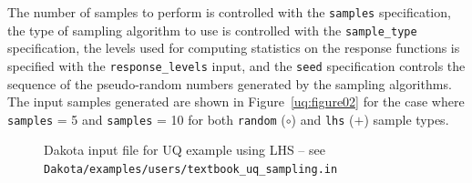 The number of samples to
perform is controlled with the \texttt{samples} specification, the
type of sampling algorithm to use is controlled with the
\texttt{sample\_type} specification, the levels used for computing
statistics on the response functions is specified with the
\texttt{response\_levels} input, and the \texttt{seed} specification
controls the sequence of the pseudo-random numbers generated by the
sampling algorithms. The input samples generated are shown in
Figure~\ref{uq:figure02} for the case where \texttt{samples} = 5 and
\texttt{samples} = 10 for both \texttt{random} ($\circ$) and 
\texttt{lhs} ($+$) sample types.

\begin{figure}[htbp!]
  \centering \begin{bigbox} \begin{small}
   \end{small} \end{bigbox}
\caption{Dakota input file for UQ example using LHS --
see \texttt{Dakota/examples/users/textbook\_uq\_sampling.in} }
\label{uq:figure01}
\end{figure}

